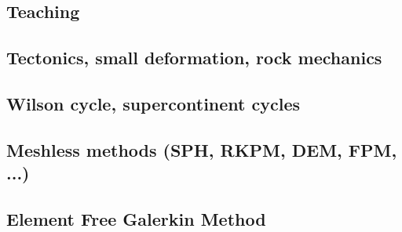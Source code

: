 \subsection{Teaching} 

{\scriptsize
\cite{kerh14}
\cite{bemg19}
}
\subsection{Tectonics, small deformation, rock mechanics}

{\scriptsize
\noindent
\cite{ilma93}
\cite{hept96}
\cite{esfm08}
\cite{lega12}
}

\subsection{Wilson cycle, supercontinent cycles}

{\scriptsize
\noindent
\cite{trry95}
\cite{evan03}
\cite{zhzl07}\cite{copb07}
\cite{zhzm09}\cite{onlj09}
\cite{lemj11}
\cite{buto14}\cite{helo14}\cite{roct14}
\cite{begb19}\cite{wihb19}
}

\subsection{Meshless methods (SPH, RKPM, DEM, FPM, ...)}
 
 

{\scriptsize
\noindent
\cite{lucy77}
\cite{beko96}
\cite{mofz97}
\cite{begl00}
\cite{lilr02}
\cite{lill03}
\cite{wali04}
\cite{febh05}\cite{lixl05}
\cite{dacl10}
\cite{prcl11}\cite{kukg11}
\cite{koau13}\cite{viau13}
\cite{dazs14}
\cite{nifs15}
\cite{krrk18}
}

\subsection{Element Free Galerkin Method}
 

